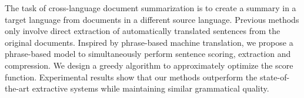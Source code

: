 The task of cross-language document summarization is to create a summary in a target language from documents in a different source language. Previous methods only involve direct  extraction of automatically translated sentences from the original documents. Inspired by phrase-based machine translation, we propose a phrase-based model to simultaneously perform sentence scoring, extraction and compression. We design a greedy algorithm to approximately optimize the score function. Experimental results show that our methods outperform the state-of-the-art extractive systems while maintaining similar grammatical quality.
